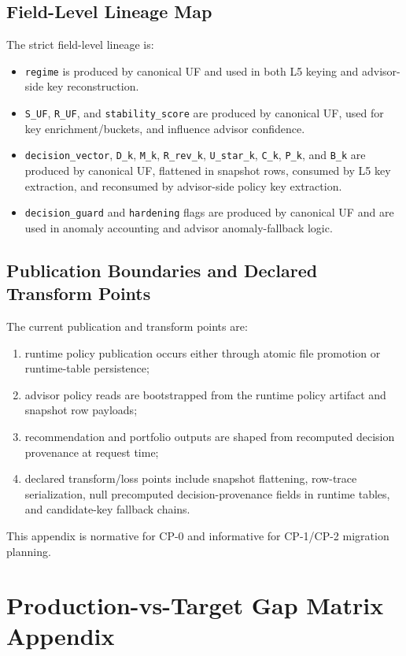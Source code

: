 \documentclass[11pt]{report}
\begin{document}
\section{Field-Level Lineage Map}
The strict field-level lineage is:
\begin{itemize}
    \item \texttt{regime} is produced by canonical UF and used in both L5 keying and advisor-side key reconstruction.
    \item \texttt{S\_UF}, \texttt{R\_UF}, and \texttt{stability\_score} are produced by canonical UF, used for key enrichment/buckets, and influence advisor confidence.
    \item \texttt{decision\_vector}, \texttt{D\_k}, \texttt{M\_k}, \texttt{R\_rev\_k}, \texttt{U\_star\_k}, \texttt{C\_k}, \texttt{P\_k}, and \texttt{B\_k} are produced by canonical UF, flattened in snapshot rows, consumed by L5 key extraction, and reconsumed by advisor-side policy key extraction.
    \item \texttt{decision\_guard} and \texttt{hardening} flags are produced by canonical UF and are used in anomaly accounting and advisor anomaly-fallback logic.
\end{itemize}

\section{Publication Boundaries and Declared Transform Points}
The current publication and transform points are:
\begin{enumerate}[leftmargin=1.2cm]
    \item runtime policy publication occurs either through atomic file promotion or runtime-table persistence;
    \item advisor policy reads are bootstrapped from the runtime policy artifact and snapshot row payloads;
    \item recommendation and portfolio outputs are shaped from recomputed decision provenance at request time;
    \item declared transform/loss points include snapshot flattening, row-trace serialization, null precomputed decision-provenance fields in runtime tables, and candidate-key fallback chains.
\end{enumerate}
This appendix is normative for CP-0 and informative for CP-1/CP-2 migration planning.
\chapter{Production-vs-Target Gap Matrix Appendix}
\end{document}

